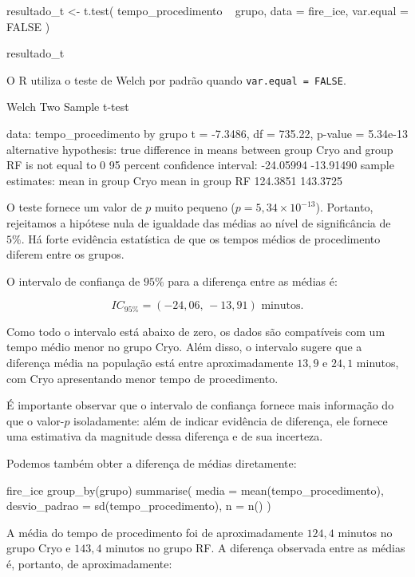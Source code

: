\begin{code}
resultado_t <-
  t.test(
    tempo_procedimento ~ grupo,
    data = fire_ice,
    var.equal = FALSE
  )

resultado_t
\end{code}

O R utiliza o teste de Welch por padrão quando
\texttt{var.equal = FALSE}.

\begin{code}[Resultado]
  	Welch Two Sample t-test

data:  tempo_procedimento by grupo
t = -7.3486, df = 735.22, p-value = 5.34e-13
alternative hypothesis: true difference in means between group Cryo and group RF is not equal to 0
95 percent confidence interval:
 -24.05994 -13.91490
sample estimates:
mean in group Cryo   mean in group RF 
          124.3851           143.3725 
\end{code}

O teste fornece um valor de $p$ muito pequeno
($p = 5{,}34\times10^{-13}$). Portanto, rejeitamos a hipótese nula de
igualdade das médias ao nível de significância de $5\%$. Há forte evidência
estatística de que os tempos médios de procedimento diferem entre os grupos.

O intervalo de confiança de $95\%$ para a diferença entre as médias é:

\[
IC_{95\%} = (-24{,}06,\,-13{,}91)\text{ minutos}.
\]

Como todo o intervalo está abaixo de zero, os dados são compatíveis com um
tempo médio menor no grupo Cryo. Além disso, o intervalo sugere que a
diferença média na população está entre aproximadamente $13{,}9$ e
$24{,}1$ minutos, com Cryo apresentando menor tempo de procedimento.

É importante observar que o intervalo de confiança fornece mais informação
do que o valor-$p$ isoladamente: além de indicar evidência de diferença,
ele fornece uma estimativa da magnitude dessa diferença e de sua incerteza.

Podemos também obter a diferença de médias diretamente:

\begin{code}
fire_ice %
  group_by(grupo) %
  summarise(
    media = mean(tempo_procedimento),
    desvio_padrao = sd(tempo_procedimento),
    n = n()
  )
\end{code}

A média do tempo de procedimento foi de aproximadamente $124{,}4$ minutos
no grupo Cryo e $143{,}4$ minutos no grupo RF. A diferença observada entre
as médias é, portanto, de aproximadamente:

